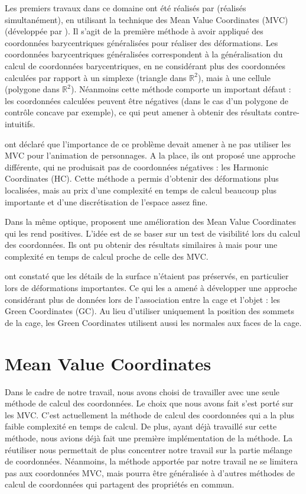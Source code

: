 Les premiers travaux dans ce domaine ont été réalisés par \cite{JSW05}
\cite{FKR05} (réalisés simultanément), en utilisant la technique des Mean
Value Coordinates (MVC) (développée par \cite{Flo03}). Il s'agit de la
première méthode à avoir appliqué des coordonnées barycentriques généralisées
pour réaliser des déformations. Les coordonnées barycentriques généralisées
correspondent à la généralisation du calcul de coordonnées barycentriques, en
ne considérant plus des coordonnées calculées par rapport à un simplexe
(triangle dans $\mathbb{R}^2$), mais à une cellule (polygone dans
$\mathbb{R}^2$). Néanmoins cette méthode comporte un important défaut : les
coordonnées calculées peuvent être négatives (dans le cas d'un polygone de
contrôle concave par exemple), ce qui peut amener à obtenir des résultats
contre-intuitifs.

\cite{JMDGS07} ont déclaré que l'importance de ce problème devait amener à ne
pas utiliser les MVC pour l'animation de personnages. A la place, ils ont
proposé une approche différente, qui ne produisait pas de coordonnées
négatives : les Harmonic Coordinates (HC). Cette méthode a permis d'obtenir
des déformations plus localisées, mais au prix d'une complexité en temps de
calcul beaucoup plus importante et d'une discrétisation de l'espace assez
fine.

Dans la même optique, \cite{LKCL07} proposent une amélioration des Mean Value
Coordinates qui les rend positives. L'idée est de se baser sur un test de
visibilité lors du calcul des coordonnées. Ils ont pu obtenir des résultats
similaires à \cite{JMDGS07} mais pour une complexité en temps de calcul proche
de celle des MVC.

\cite{LLC08} ont constaté que les détails de la surface n'étaient pas
préservés, en particulier lors de déformations importantes. Ce qui les a amené
à développer une approche considérant plus de données lors de l'association
entre la cage et l'objet : les Green Coordinates (GC). Au lieu d'utiliser
uniquement la position des sommets de la cage, les Green Coordinates utilisent
aussi les normales aux faces de la cage.

\section{Mean Value Coordinates}

Dans le cadre de notre travail, nous avons choisi de travailler avec une seule
méthode de calcul des coordonnées. Le choix que nous avons fait s'est porté
sur les MVC. C'est actuellement la méthode de calcul des coordonnées qui a la
plus faible complexité en temps de calcul. De plus, ayant déjà travaillé sur
cette méthode, nous avions déjà fait une première implémentation de la
méthode. La réutiliser nous permettait de plus concentrer notre travail sur la
partie mélange de coordonnées. Néanmoins, la méthode apportée par notre
travail ne se limitera pas aux coordonnées MVC, mais pourra être généralisée à
d'autres méthodes de calcul de coordonnées qui partagent des propriétés en
commun.

